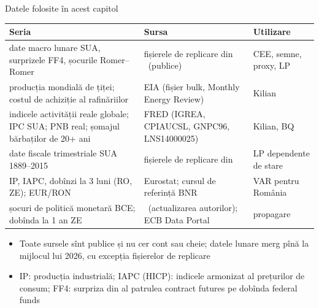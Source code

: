 \begin{frame}{Datele folosite în acest capitol}
\itemsize{\footnotesize}
\begin{center}
\scriptsize
\begin{tabular}{>{\raggedright\arraybackslash}p{4.6cm}>{\raggedright\arraybackslash}p{4.9cm}>{\raggedright\arraybackslash}p{2.4cm}}
\toprule
\textbf{Seria} & \textbf{Sursa} & \textbf{Utilizare} \\
\midrule
date macro lunare SUA, surprizele FF4, șocurile Romer--Romer & fișierele de replicare din \ (publice) & CEE, semne, proxy, LP \\
producția mondială de țiței; costul de achiziție al rafinăriilor & EIA (fișier bulk, Monthly Energy Review) & Kilian \\
indicele activității reale globale; IPC SUA; PNB real; șomajul bărbaților de 20+ ani & FRED (IGREA, CPIAUCSL, GNPC96, LNS14000025) & Kilian, BQ \\
date fiscale trimestriale SUA 1889--2015 & fișierele de replicare din {} & LP dependente de stare \\
IP, IAPC, dobînzi la 3 luni (RO, ZE); EUR/RON & Eurostat; cursul de referință BNR & VAR pentru România \\
șocuri de politică monetară BCE; dobînda la 1 an ZE & \ (actualizarea autorilor); ECB Data Portal & propagare \\
\bottomrule
\end{tabular}
\end{center}
\begin{itemize}
    \item Toate sursele sînt publice și nu cer cont sau cheie; datele lunare merg pînă la mijlocul lui 2026, cu excepția fișierelor de replicare
    \item IP: producția industrială; IAPC (HICP): indicele armonizat al prețurilor de consum; FF4: surpriza din al patrulea contract futures pe dobînda federal funds
\end{itemize}
\end{frame}

